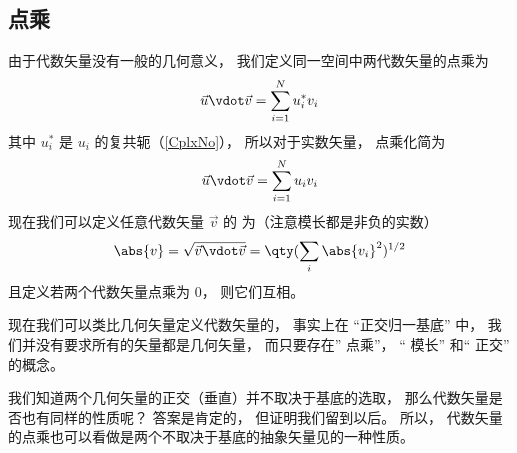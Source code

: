 \subsection{点乘}
由于代数矢量没有一般的几何意义， 我们定义同一空间中两代数矢量的点乘为
\begin{equation}
\vec u \vdot \vec v = \sum_{i = 1}^N u_i^* v_i
\end{equation}
其中 $u_i^*$ 是 $u_i$ 的复共轭（\autoref{CplxNo}）， 所以对于实数矢量， 点乘化简为
\begin{equation}
\vec u \vdot \vec v = \sum_{i = 1}^N u_i v_i
\end{equation}
现在我们可以定义任意代数矢量 $\vec v$ 的 为（注意模长都是非负的实数）
\begin{equation}
\abs{v} = \sqrt{\vec v \vdot \vec v} = \qty(\sum_i \abs{v_i}^2)^{1/2}
\end{equation}
且定义若两个代数矢量点乘为 0， 则它们互相。

现在我们可以类比几何矢量定义代数矢量的， 事实上在 “正交归一基底” 中， 我们并没有要求所有的矢量都是几何矢量， 而只要存在” 点乘”， “ 模长” 和“ 正交” 的概念。

我们知道两个几何矢量的正交（垂直）并不取决于基底的选取， 那么代数矢量是否也有同样的性质呢？ 答案是肯定的， 但证明我们留到以后。%
所以， 代数矢量的点乘也可以看做是两个不取决于基底的抽象矢量见的一种性质。




